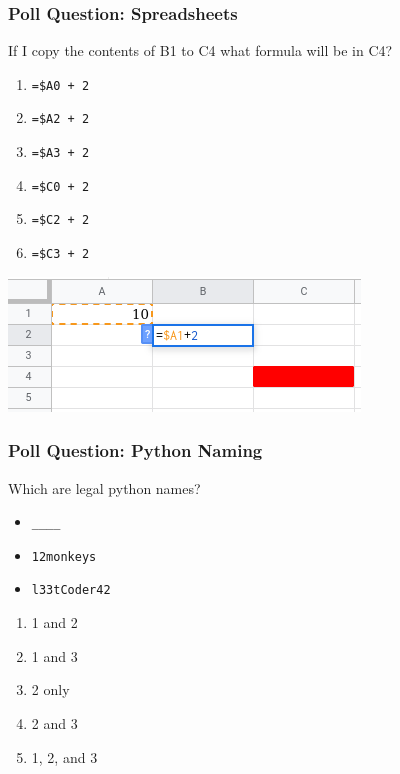 \documentclass{beamer}
\begin{document}
%
%
%
\begin{frame}[fragile]
  \frametitle{Poll Question: Spreadsheets}
  If I copy the contents of B1 to C4 what formula will be in C4?
  \vfill
  \begin{minipage}{.3\textwidth}
    \begin{enumerate}
      \item \lstinline{=$A0 + 2}
      \item \lstinline{=$A2 + 2}
      \item \lstinline{=$A3 + 2}
      \item \lstinline{=$C0 + 2}
      \item \lstinline{=$C2 + 2}
      \item \lstinline{=$C3 + 2}
    \end{enumerate}
  \end{minipage}
  \begin{minipage}{.65\textwidth}
    \includegraphics[width=\textwidth]{./imgs/spreadsheet-slide-1.png}
  \end{minipage}
\end{frame}

%
%
%
\begin{frame}[fragile]
  \frametitle{Poll Question: Python Naming}
  Which are legal python names?
  \begin{itemize}
    \item \lstinline{____}
    \item \lstinline{12monkeys}
    \item \lstinline{l33tCoder42}
  \end{itemize}
  \begin{enumerate}
    \item 1 and 2
    \item 1 and 3
    \item 2 only
    \item 2 and 3
    \item 1, 2, and 3
  \end{enumerate}
\end{frame}
\end{document}
